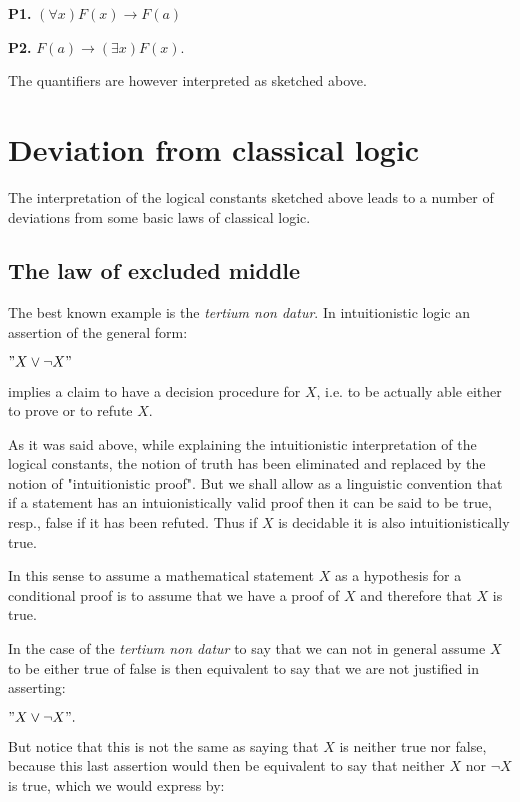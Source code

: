 \documentclass[12pt]{article}
\begin{document}
\qquad \textbf{P1.} \enspace $(\forall x) F (x) \rightarrow F (a)$ 

\qquad \textbf{P2.} \enspace $F (a) \rightarrow (\exists x) F (x).$

The quantifiers are however interpreted as sketched above.

\section{Deviation from classical logic}\normalsize

The interpretation of the logical constants sketched above  leads  to  a number of deviations  from some basic laws of classical logic.

\subsection{The law of excluded middle}

The best known example is the \emph{tertium non datur}. In intuitionistic logic an assertion of the general form:

\begin{center}
$"X \vee \neg X"$
\end{center}

implies a claim to have a decision procedure for $X$, i.e. to be actually able either to prove or to refute $X$. 

As it was said above, while explaining the intuitionistic interpretation of the logical constants, the notion of truth has been eliminated and replaced by the notion of "intuitionistic proof". But we  shall allow as a linguistic convention that if a statement has an intuionistically valid proof then it can be said to be true, resp., false if it has been refuted. Thus if $X$ is decidable it is also intuitionistically true.

In this sense to assume a mathematical statement $X$ as a hypothesis for a conditional proof is to assume that we have a proof of $X$ and therefore that $X$ is true.

In the case of the \emph{tertium non datur} to say that we can not in general assume $X$ to be either true of false is then equivalent to say that we are not justified in asserting:

\begin{center}
$"X \vee \neg X".$
\end{center}

But notice that this is not the same as saying that $X$ is neither true nor false, because this last assertion would then be equivalent to say that neither $X$ nor $\neg X$ is true, which we would express by:
\end{document}
